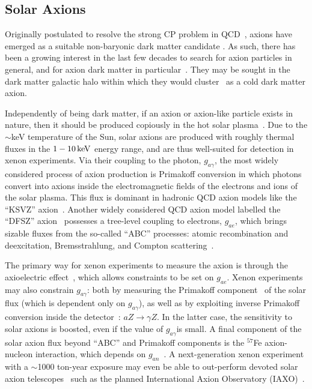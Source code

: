 \subsection{Solar Axions}\label{sec:solar_axions}

Originally postulated to resolve the strong CP problem in QCD~\cite{PecceiQuinn_1977,Weinberg:1977ma,Wilczek:1977pj}, axions have emerged as a suitable non-baryonic dark matter candidate \cite{Preskill:1982cy,Abbott:1982af,Dine:1982ah,Ipser:1983mw,Duffy:2009ig}. As such, there has been a growing interest in the last few decades to search for axion particles in general, and for axion dark matter in particular~\cite{Hagmann:1990tj,Sikivie:1999sy,Raffelt:2006rj,Arik:2011rx,Du:2018uak}. They may be sought in the dark matter galactic halo within which they would cluster~\cite{Hagmann:1998cb} as a cold dark matter axion. 

Independently of being dark matter, if an axion or axion-like particle exists in nature, then it should be produced copiously in the hot solar plasma~\cite{Dimopoulos:1986kc}. Due to the $\sim$keV temperature of the Sun, solar axions are produced with roughly thermal fluxes in the $1-10\, \mathrm{keV}$ energy range, and are thus well-suited for detection in xenon experiments. Via their coupling to the photon, $g_{a\gamma}$, the most widely considered process of axion production is Primakoff conversion in which photons convert into axions inside the electromagnetic fields of the electrons and ions of the solar plasma. This flux is dominant in hadronic QCD axion models like the ``KSVZ'' axion~\cite{Kim:1979if,Shifman:1979if}. Another widely considered QCD axion model labelled the ``DFSZ'' axion~\cite{Dine:1981rt,Zhitnitsky:1980tq} possesses a tree-level coupling to electrons, $g_{ae}$, which brings sizable fluxes from the so-called ``ABC'' processes: atomic recombination and deexcitation, Bremsstrahlung, and Compton scattering~\cite{Redondo:2013wwa}. 

The primary way for xenon experiments to measure the axion is through the axioelectric effect~\cite{Derevianko:2010kz}, which allows constraints to be set on $g_{ae}$. Xenon experiments may also constrain $g_{a\gamma}$: both by measuring the Primakoff component~\cite{Pirmakoff:1951pj} of the solar flux (which is dependent only on $g_{a\gamma}$), as well as by exploiting inverse Primakoff conversion inside the detector~\cite{Dent:2020jhf,Gao:2020wer}: $a Z \rightarrow \gamma Z$. In the latter case, the sensitivity to solar axions is boosted, even if the value of $g_{a\gamma}$is small. A final component of the solar axion flux beyond ``ABC'' and Primakoff components is the $^{57}$Fe axion-nucleon interaction, which depends on $g_{an}$~\cite{Moriyama:1995bz}. A next-generation xenon experiment with a $\sim$1000 ton-year exposure may even be able to out-perform devoted solar axion telescopes~\cite{Dent:2020jhf} such as the planned International Axion Observatory (IAXO)~\cite{Armengaud:2019uso}.

